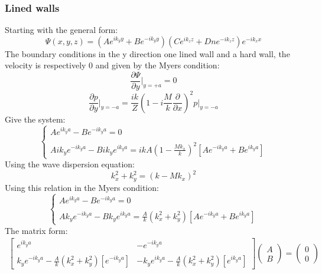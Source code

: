 \subsubsection*{Lined walls}\label{sec:EigenvalueLined}
Starting with the general form:
\begin{equation}
        \Psi(x,y,z)=(Ae^{ik_{y}y}+Be^{-ik_{y}y})(Ce^{ik_{z}z}+Dne^{-ik_{z}z})e^{-ik_{x}x}
\end{equation}
The boundary conditions in the y direction one lined wall and a hard wall, the velocity is respectively 0 and given by the Myers condition:
\begin{equation}
    \frac{\partial\Psi}{\partial y} \Big|_{y=+a}=0
\end{equation}
\begin{equation}
    \frac{\partial p}{\partial y}\Bigg|_{y=-a}=\frac{ik}{Z}(1-i\frac{M}{k}\frac{\partial}{\partial x})^2 p\Bigg|_{y=-a}
\end{equation}
Give the system:
\begin{equation}\label{eq:2}
    \left\{
    \begin{array}{ll}
    Ae^{ik_ya}-Be^{-ik_ya}=0\\
        \\
    Aik_ye^{-ik_ya}-Bik_ye^{ik_ya}=ikA(1-\frac{Mk_x}{k})^2[Ae^{-ik_ya}+Be^{ik_ya}]
    \end{array}
    \right.
\end{equation}
Using the wave dispersion equation:
\begin{equation}
   k_x^2+k_y^2=(k-Mk_x)^2 
\end{equation}
Using this relation in the Myers condition:
\begin{equation}
    \left\{
    \begin{array}{ll}
    Ae^{ik_ya}-Be^{-ik_ya}=0\\
        \\
    Ak_ye^{-ik_ya}-Bk_ye^{ik_ya}=\frac{A}{k}(k_x^2+k_y^2)[Ae^{-ik_ya}+Be^{ik_ya}]
    \end{array}
    \right.
\end{equation}\label{eq:3}
The matrix form: 
 \begin{gather}
    \begin{bmatrix}
     e^{ik_ya} & -e^{-ik_ya} \\
      \\
     k_ye^{-ik_ya}-\frac{A}{k}(k_x^2+k_y^2)[e^{-ik_ya}] & -k_ye^{ik_ya}-\frac{A}{k}(k_x^2+k_y^2)[e^{ik_ya}]
    \end{bmatrix}
    \begin{pmatrix}
       A\\
       B
    \end{pmatrix}
    =
    \begin{pmatrix}
      0\\
      0
    \end{pmatrix}
 \end{gather}
